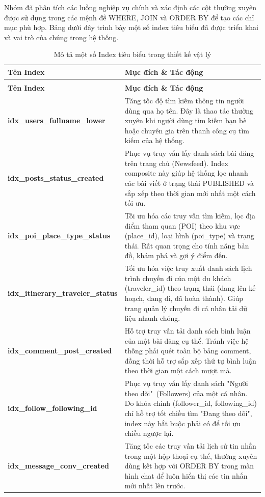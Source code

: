 Nhóm đã phân tích các luồng nghiệp vụ chính và xác định các cột thường xuyên được sử dụng trong các mệnh đề WHERE, JOIN và ORDER BY để tạo các chỉ mục phù hợp. Bảng dưới đây trình bày một số index tiêu biểu đã được triển khai và vai trò của chúng trong hệ thống.
\begin{longtable}{|p{7cm}|p{7cm}|}
    \caption{Mô tả một số Index tiêu biểu trong thiết kế vật lý}\\
    \hline
    \textbf{Tên Index} & \textbf{Mục đích \& Tác động} \\
    \hline
    \endfirsthead
    
    \caption{Mô tả một số Index tiêu biểu trong thiết kế vật lý}\\
    \hline
    \textbf{Tên Index} & \textbf{Mục đích \& Tác động} \\ \hline
    \endhead
    \hline
    \endlastfoot

    \textbf{idx\_users\_fullname\_lower} & Tăng tốc độ tìm kiếm thông tin người dùng qua họ tên. Đây là thao tác thường xuyên khi người dùng tìm kiếm bạn bè hoặc chuyên gia trên thanh công cụ tìm kiếm của hệ thống. \\ \hline
    \textbf{idx\_posts\_status\_created} & Phục vụ truy vấn lấy danh sách bài đăng trên trang chủ (Newsfeed). Index composite này giúp hệ thống lọc nhanh các bài viết ở trạng thái PUBLISHED và sắp xếp theo thời gian mới nhất một cách tối ưu. \\ \hline
    \textbf{idx\_poi\_place\_type\_status} & Tối ưu hóa các truy vấn tìm kiếm, lọc địa điểm tham quan (POI) theo khu vực (place\_id), loại hình (poi\_type) và trạng thái. Rất quan trọng cho tính năng bản đồ, khám phá và gợi ý điểm đến. \\ \hline
    \textbf{idx\_itinerary\_traveler\_status} & Tối ưu hóa việc truy xuất danh sách lịch trình chuyến đi của một du khách (traveler\_id) theo trạng thái (đang lên kế hoạch, đang đi, đã hoàn thành). Giúp trang quản lý chuyến đi cá nhân tải dữ liệu nhanh chóng. \\ \hline  
    \textbf{idx\_comment\_post\_created} & Hỗ trợ truy vấn tải danh sách bình luận của một bài đăng cụ thể. Tránh việc hệ thống phải quét toàn bộ bảng comment, đồng thời hỗ trợ sắp xếp thứ tự bình luận theo thời gian một cách mượt mà. \\ \hline
    \textbf{idx\_follow\_following\_id} & Phục vụ truy vấn lấy danh sách "Người theo dõi"\ (Followers) của một cá nhân. Do khóa chính (follower\_id, following\_id) chỉ hỗ trợ tốt chiều tìm "Đang theo dõi", index này bắt buộc phải có để tối ưu chiều ngược lại. \\ \hline
    \textbf{idx\_message\_conv\_created} & Tăng tốc các truy vấn tải lịch sử tin nhắn trong một hộp thoại cụ thể, thường xuyên dùng kết hợp với ORDER BY trong màn hình chat để luôn hiển thị các tin nhắn mới nhất lên trước. \\ \hline
\end{longtable}
